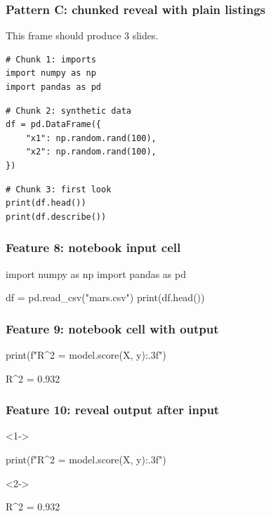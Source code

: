 \documentclass[t,10pt,aspectratio=169,rounded]{beamer}
\begin{document}
\begin{frame}[fragile]
	\frametitle{Pattern C: chunked reveal with plain listings}
	This frame should produce 3 slides.
	\begin{lstlisting}[style=ceacarbonplain]
# Chunk 1: imports
import numpy as np
import pandas as pd
\end{lstlisting}
	\pause
	\begin{lstlisting}[style=ceacarbonplain]
# Chunk 2: synthetic data
df = pd.DataFrame({
    "x1": np.random.rand(100),
    "x2": np.random.rand(100),
})
\end{lstlisting}
	\pause
	\begin{lstlisting}[style=ceacarbonplain]
# Chunk 3: first look
print(df.head())
print(df.describe())
\end{lstlisting}
\end{frame}

\begin{frame}[fragile]
	\frametitle{Feature 8: notebook input cell}
	\begin{notebookin}
		import numpy as np
		import pandas as pd

		df = pd.read_csv("mars.csv")
		print(df.head())
	\end{notebookin}
\end{frame}

\begin{frame}[fragile]
	\frametitle{Feature 9: notebook cell with output}
	\begin{notebookin}
		print(f"R^2 = {model.score(X, y):.3f}")
	\end{notebookin}
	\begin{notebookout}
		R^2 = 0.932
	\end{notebookout}
\end{frame}

\begin{frame}[fragile]
	\frametitle{Feature 10: reveal output after input}
	\begin{onlyenv}<1->
		\begin{notebookin}
			print(f"R^2 = {model.score(X, y):.3f}")
		\end{notebookin}
	\end{onlyenv}
	\begin{onlyenv}<2->
		\begin{notebookout}
			R^2 = 0.932
		\end{notebookout}
	\end{onlyenv}
\end{frame}

\begin{frame}[plain]
\end{frame}
\end{document}

